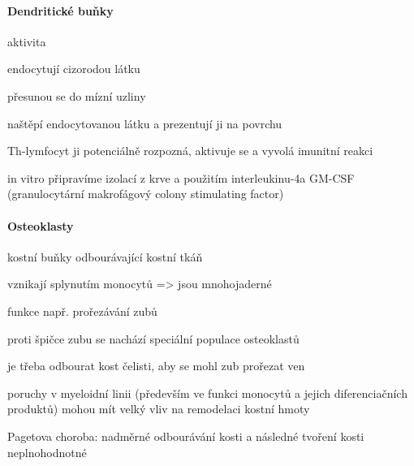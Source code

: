 \documentclass[DIV=8]{scrreprt}
\begin{document}
\paragraph{Dendritické buňky}
\begin{myItemize}[nosep]
    \item aktivita
\begin{myEnumerate}[nosep]
    \item endocytují cizorodou látku
    \item přesunou se do mízní uzliny
    \item naštěpí endocytovanou látku a prezentují ji na povrchu
    \item Th-lymfocyt ji potenciálně rozpozná, aktivuje se a vyvolá imunitní reakci
\end{myEnumerate}

    \item in vitro připravíme izolací z krve a použitím interleukinu-4a GM-CSF (granulocytární makrofágový colony stimulating factor)
\end{myItemize}



\paragraph{Osteoklasty}
\begin{myItemize}[nosep]
    \item kostní buňky odbourávající kostní tkáň
    \item vznikají splynutím monocytů => jsou mnohojaderné
    \item funkce např. prořezávání zubů
\begin{myItemize}[nosep]
    \item proti špičce zubu se nachází speciální populace osteoklastů
    \item je třeba odbourat kost čelisti, aby se mohl zub prořezat ven
\end{myItemize}

    \item poruchy v myeloidní linii (především ve funkci monocytů a jejich diferenciačních produktů) mohou mít velký vliv na remodelaci kostní hmoty
\begin{myItemize}[nosep]
    \item Pagetova choroba: nadměrné odbourávání kosti a následné tvoření kosti neplnohodnotné
\end{myItemize}

\end{myItemize}
\end{document}
